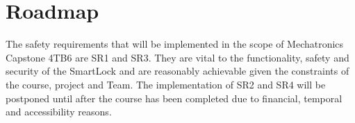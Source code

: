 \documentclass{article}
\begin{document}
\section{Roadmap}
The safety requirements that will be implemented in the scope of Mechatronics Capstone 4TB6 are SR1 and SR3. They are vital to the functionality, safety and security of the SmartLock and are reasonably achievable given the constraints of the course, project and Team. The implementation of SR2 and SR4 will be postponed until after the course has been completed due to financial, temporal and accessibility reasons. 
\end{document}
